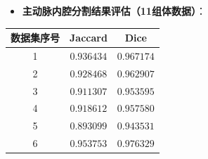 \begin{frame}
\begin{itemize}
  \item \textbf{主动脉内腔分割结果评估（11组体数据）}：
\end{itemize}
\begin{table}[t]
\renewcommand{\arraystretch}{0.5}
\centering
\begin{tabular*}{70mm}{c c c}
\toprule
\hspace{2mm} \small{数据集序号}  & \hspace{2mm} \small{Jaccard}    & \hspace{2mm} \small{Dice}       \\
\midrule
\hspace{2mm} \small{1}           & \hspace{2mm} \small{$0.936434$} & \hspace{2mm} \small{$0.967174$} \\
\midrule
\hspace{2mm} \small{2}           & \hspace{2mm} \small{$0.928468$} & \hspace{2mm} \small{$0.962907$} \\
\midrule
\hspace{2mm} \small{3}           & \hspace{2mm} \small{$0.911307$} & \hspace{2mm} \small{$0.953595$} \\
\midrule
\hspace{2mm} \small{4}           & \hspace{2mm} \small{$0.918612$} & \hspace{2mm} \small{$0.957580$} \\
\midrule
\hspace{2mm} \small{5}           & \hspace{2mm} \small{$0.893099$} & \hspace{2mm} \small{$0.943531$} \\
\midrule
\hspace{2mm} \small{6}           & \hspace{2mm} \small{$0.953753$} & \hspace{2mm} \small{$0.976329$} \\

\end{tabular*}
\end{table}
\end{frame}
